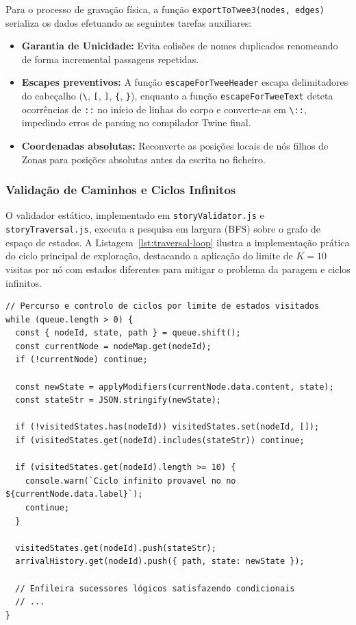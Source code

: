 Para o processo de gravação física, a função \texttt{exportToTwee3(nodes, edges)} serializa os dados efetuando as seguintes tarefas auxiliares:
\begin{itemize}
    \item \textbf{Garantia de Unicidade:} Evita colisões de nomes duplicados renomeando de forma incremental passagens repetidas.
    \item \textbf{Escapes preventivos:} A função \texttt{escapeForTweeHeader} escapa delimitadores do cabeçalho (\lstinline|\|, \lstinline|[|, \lstinline|]|, \lstinline|{|, \lstinline|}|), enquanto a função \texttt{escapeForTweeText} deteta ocorrências de \lstinline|::| no início de linhas do corpo e converte-as em \lstinline|\::|, impedindo erros de parsing no compilador Twine final.
    \item \textbf{Coordenadas absolutas:} Reconverte as posições locais de nós filhos de Zonas para posições absolutas antes da escrita no ficheiro.
\end{itemize}

\subsubsection{Validação de Caminhos e Ciclos Infinitos}
O validador estático, implementado em \texttt{storyValidator.js} e \texttt{storyTraversal.js}, executa a pesquisa em largura (BFS) sobre o grafo de espaço de estados. A Listagem~\ref{lst:traversal-loop} ilustra a implementação prática do ciclo principal de exploração, destacando a aplicação do limite de $K=10$ visitas por nó com estados diferentes para mitigar o problema da paragem e ciclos infinitos.

\begin{listing}[!htpb]
\begin{lstlisting}
// Percurso e controlo de ciclos por limite de estados visitados
while (queue.length > 0) {
  const { nodeId, state, path } = queue.shift();
  const currentNode = nodeMap.get(nodeId);
  if (!currentNode) continue;
  
  const newState = applyModifiers(currentNode.data.content, state);
  const stateStr = JSON.stringify(newState);
  
  if (!visitedStates.has(nodeId)) visitedStates.set(nodeId, []);
  if (visitedStates.get(nodeId).includes(stateStr)) continue;
  
  if (visitedStates.get(nodeId).length >= 10) {
    console.warn(`Ciclo infinito provavel no no ${currentNode.data.label}`);
    continue;
  }
  
  visitedStates.get(nodeId).push(stateStr);
  arrivalHistory.get(nodeId).push({ path, state: newState });
  
  // Enfileira sucessores lógicos satisfazendo condicionais
  // ...
}
\end{lstlisting}
\caption{Ciclo principal de exploração do espaço de estados no motor storyTraversal.js.}
\label{lst:traversal-loop}
\end{listing}

